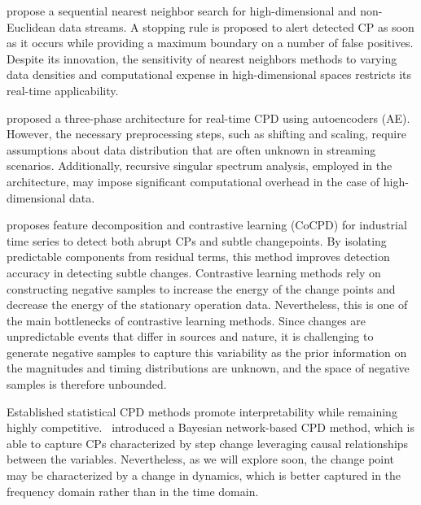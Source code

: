 \cite{Chu2022} propose a sequential nearest neighbor search for high-dimensional and non-Euclidean data streams. A stopping rule is proposed to alert detected CP as soon as it occurs while providing a maximum boundary on a number of false positives. Despite its innovation, the sensitivity of nearest neighbors methods to varying data densities and computational expense in high-dimensional spaces restricts its real-time applicability.

\cite{Gupta2022} proposed a three-phase architecture for real-time CPD using autoencoders (AE). However, the necessary preprocessing steps, such as shifting and scaling, require assumptions about data distribution that are often unknown in streaming scenarios. Additionally, recursive singular spectrum analysis, employed in the architecture, may impose significant computational overhead in the case of high-dimensional data.

\cite{Bao2024} proposes feature decomposition and contrastive learning (CoCPD) for industrial time series to detect both abrupt CPs and subtle changepoints. By isolating predictable components from residual terms, this method improves detection accuracy in detecting subtle changes. Contrastive learning methods rely on constructing negative samples to increase the energy of the change points and decrease the energy of the stationary operation data. Nevertheless, this is one of the main bottlenecks of contrastive learning methods. Since changes are unpredictable events that differ in sources and nature, it is challenging to generate negative samples to capture this variability as the prior information on the magnitudes and timing distributions are unknown, and the space of negative samples is therefore unbounded.

Established statistical CPD methods promote interpretability while remaining highly competitive.~\cite{Rajaganapathy2022} introduced a Bayesian network-based CPD method, which is able to capture CPs characterized by step change leveraging causal relationships between the variables. Nevertheless, as we will explore soon, the change point may be characterized by a change in dynamics, which is better captured in the frequency domain rather than in the time domain.


